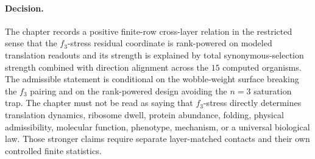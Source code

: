 \paragraph{Decision.}
The chapter records a positive finite-row cross-layer relation in the restricted sense that the $f_3$-stress residual coordinate is rank-powered on modeled translation readouts and its strength is explained by total synonymous-selection strength combined with direction alignment across the $15$ computed organisms.  The admissible statement is conditional on the wobble-weight surface breaking the $f_3$ pairing and on the rank-powered design avoiding the $n=3$ saturation trap.  The chapter must not be read as saying that $f_3$-stress directly determines translation dynamics, ribosome dwell, protein abundance, folding, physical admissibility, molecular function, phenotype, mechanism, or a universal biological law.  Those stronger claims require separate layer-matched contacts and their own controlled finite statistics.